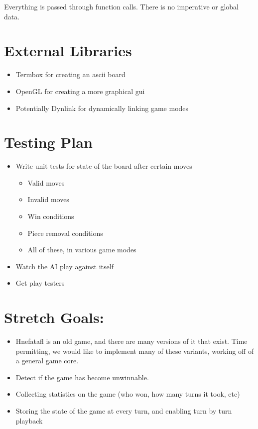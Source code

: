 \documentclass[11pt, oneside]{article}
\begin{document}
Everything is passed through function calls. There is no imperative or global
data.

\section{External Libraries}
\begin{itemize}
\item Termbox for creating an ascii board
\item OpenGL for creating a more graphical gui
\item Potentially Dynlink for dynamically linking game modes
\end{itemize}

\section{Testing Plan}
\begin{itemize}
\item Write unit tests for state of the board after certain moves
  \begin{itemize}
  \item Valid moves
  \item Invalid moves
  \item Win conditions
  \item Piece removal conditions
  \item All of these, in various game modes
  \end{itemize}
\item Watch the AI play against itself
\item Get play testers
\end{itemize}

\section{Stretch Goals:}
\begin{itemize}
\item Hnefatafl is an old game, and there are many versions of it that exist.
  Time permitting, we would like to implement many of these variants, working
  off of a general game core.
\item Detect if the game has become unwinnable.
\item Collecting statistics on the game (who won, how many turns it took, etc)
\item Storing the state of the game at every turn, and enabling turn by turn
  playback
\end{itemize}
\end{document}
